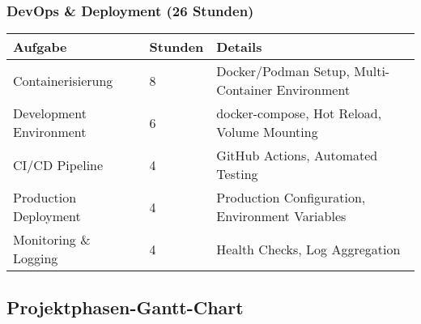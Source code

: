 \documentclass[a4paper,12pt]{article}
\begin{document}
\subsubsection{DevOps \& Deployment (26 Stunden)}
\begin{longtable}{|p{}|p{}|p{}|}
\hline
\textbf{Aufgabe} & \textbf{Stunden} & \textbf{Details} \\
\hline
Containerisierung & 8 & Docker/Podman Setup, Multi-Container Environment \\
\hline
Development Environment & 6 & docker-compose, Hot Reload, Volume Mounting \\
\hline
CI/CD Pipeline & 4 & GitHub Actions, Automated Testing \\
\hline
Production Deployment & 4 & Production Configuration, Environment Variables \\
\hline
Monitoring \& Logging & 4 & Health Checks, Log Aggregation \\
\hline
\end{longtable}

\subsection{Projektphasen-Gantt-Chart}
\end{document}
